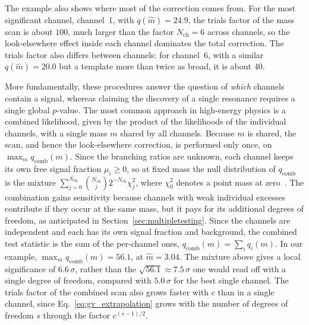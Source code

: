 The example also shows where most of the correction comes from. For the most significant channel, channel~1, with $q(\hat m)=24.9$, the trials factor of the mass scan is about $100$, much larger than the factor $N_\text{ch}=6$ across channels, so the look-elsewhere effect inside each channel dominates the total correction. The trials factor also differs between channels: for channel~6, with a similar $q(\hat m)=20.0$ but a template more than twice as broad, it is about $40$.

More fundamentally, these procedures answer the question of \emph{which} channels contain a signal, whereas claiming the discovery of a single resonance requires a single global $p$-value. The most common approach in high-energy physics is a combined likelihood, given by the product of the likelihoods of the individual channels, with a single mass $m$ shared by all channels. Because $m$ is shared, the scan, and hence the look-elsewhere correction, is performed only once, on $\max_m q_\text{comb}(m)$. Since the branching ratios are unknown, each channel keeps its own free signal fraction $\mu_i\geq0$, so at fixed mass the null distribution of $q_\text{comb}$ is the mixture $\sum_{j=0}^{N_\text{ch}}\binom{N_\text{ch}}{j}2^{-N_\text{ch}}\chi^2_j$, where $\chi^2_0$ denotes a point mass at zero~\cite{Self:1987}. The combination gains sensitivity because channels with weak individual excesses contribute if they occur at the same mass, but it pays for its additional degrees of freedom, as anticipated in Section~\ref{sec:multipletesting}. Since the channels are independent and each has its own signal fraction and background, the combined test statistic is the sum of the per-channel ones, $q_\text{comb}(m)=\sum_i q_i(m)$. In our example, $\max_m q_\text{comb}(m)=56.1$, at $\hat m=3.04$. The mixture above gives a local significance of $6.6\,\sigma$, rather than the $\sqrt{56.1}\approx7.5\,\sigma$ one would read off with a single degree of freedom, compared with $5.0\,\sigma$ for the best single channel. The trials factor of the combined scan also grows faster with $c$ than in a single channel, since Eq.~\eqref{eq:gv_extrapolation} grows with the number of degrees of freedom $s$ through the factor $c^{(s-1)/2}$.

